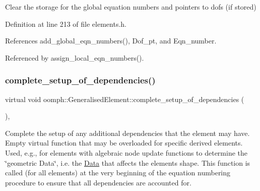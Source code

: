 Clear the storage for the global equation numbers and pointers to dofs (if stored) 



Definition at line 213 of file elements.\+h.



References add\+\_\+global\+\_\+eqn\+\_\+numbers(), Dof\+\_\+pt, and Eqn\+\_\+number.



Referenced by assign\+\_\+local\+\_\+eqn\+\_\+numbers().

\mbox{\label{classoomph_1_1GeneralisedElement_af03c43b9df873659a6ca91e39566256e}} 
\subsubsection{\texorpdfstring{complete\+\_\+setup\+\_\+of\+\_\+dependencies()}{complete\_setup\_of\_dependencies()}}
{\footnotesize\ttfamily virtual void oomph\+::\+Generalised\+Element\+::complete\+\_\+setup\+\_\+of\+\_\+dependencies (\begin{DoxyParamCaption}{ }\end{DoxyParamCaption})\hspace{0.3cm}{\ttfamily [inline]}, {\ttfamily [virtual]}}



Complete the setup of any additional dependencies that the element may have. Empty virtual function that may be overloaded for specific derived elements. Used, e.\+g., for elements with algebraic node update functions to determine the \char`\"{}geometric 
\+Data\char`\"{}, i.\+e. the \hyperlink{classoomph_1_1Data}{Data} that affects the element\textquotesingle{}s shape. This function is called (for all elements) at the very beginning of the equation numbering procedure to ensure that all dependencies are accounted for. 



